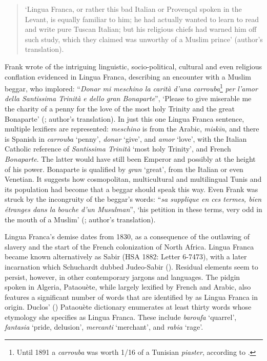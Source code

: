 \documentclass[output=paper]{langsci/langscibook}
\begin{document}
	\begin{quote}
		‘Lingua Franca, or rather this bad Italian or Provençal spoken in the Levant, is equally familiar to him; he had actually wanted to learn to read and write  pure Tuscan Italian; but his religious chiefs had warned him off such study, which they claimed was unworthy of a Muslim prince’ (author's translation).
	\end{quote}
	
	Frank wrote of the intriguing linguistic, socio-political, cultural and even religious conflation evidenced in Lingua Franca, describing an encounter with a Muslim beggar, who implored: “\textit{Donar mi meschino la carità d’una carrouba}\footnote{Until 1891 a \textit{carrouba} was worth 1/16 of a Tunisian \textit{piaster}, according to \citet{Rossetti1999}.} \textit{per l’amor della Santissima Trinità e dello gran Bonaparte}”, ‘Please to give miserable me the charity of a penny for the love of the most holy Trinity and the great Bonaparte’ (\citealt[101]{Frank1850}; author's translation). In just this one Lingua Franca sentence, multiple lexifiers are represented: \textit{meschino} is from the Arabic, \textit{miskīn}, and there is Spanish in \textit{carrouba} ‘penny’, \textit{donar} ‘give’, and \textit{amor} ‘love’, with the Italian Catholic reference of \textit{Santissima Trinità} ‘most holy Trinity’, and French \textit{Bonaparte}. The latter would have still been Emperor and possibly at the height of his power. Bonaparte is qualified by \textit{gran} ‘great’, from the Italian or even Venetian. It suggests how cosmopolitan, multicultural and multilingual Tunis and its population had become that a beggar should speak this way. Even Frank was struck by the incongruity of the beggar’s words: ``\textit{sa supplique en ces termes, bien étranges dans la bouche d’un Musulman}'', ‘his petition in these terms, very odd in the mouth of a Muslim’ (\citealt[101]{Frank1850}; author's translation).
	
	Lingua Franca’s demise dates from 1830, as a consequence of the outlawing of slavery and the start of the French colonization of North Africa. Lingua Franca became known alternatively as Sabir (HSA 1882: Letter 6-7473), with a later incarnation which Schuchardt dubbed Judeo-Sabir (\citealt[87]{Schuchardt1909}). Residual elements seem to persist, however, in other contemporary jargons and languages. The pidgin spoken in Algeria, Pataouète, while largely lexified by French and Arabic, also features a significant number of words that are identified by \citet{Lanly1962} as Lingua Franca in origin. Duclos’ (\citeyear{Duclos1992}) Pataouète dictionary enumerates at least thirty words whose etymology she specifies as Lingua Franca. These include \textit{baroufa} ‘quarrel', \textit{fantasia} ‘pride, delusion’, \textit{mercanti} ‘merchant’, and \textit{rabia} ‘rage’.
	
\end{document}
